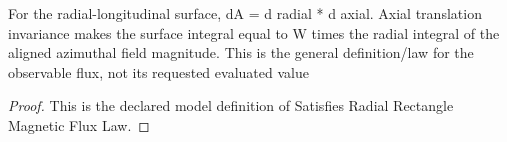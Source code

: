 \begin{definition}
  \label{def:physics:phyx-mini-0975:phyxminiproblems-problemphyxmini0975-satisfiesradialrectanglemagneticfluxlaw}
  For the radial-longitudinal surface, dA = d radial * d axial. Axial translation invariance makes the surface integral equal to W times the radial integral of the aligned azimuthal field magnitude. This is the general definition/law for the observable flux, not its requested evaluated value
\end{definition}
\begin{proof}
  This is the declared model definition of Satisfies Radial Rectangle Magnetic Flux Law.
\end{proof}
